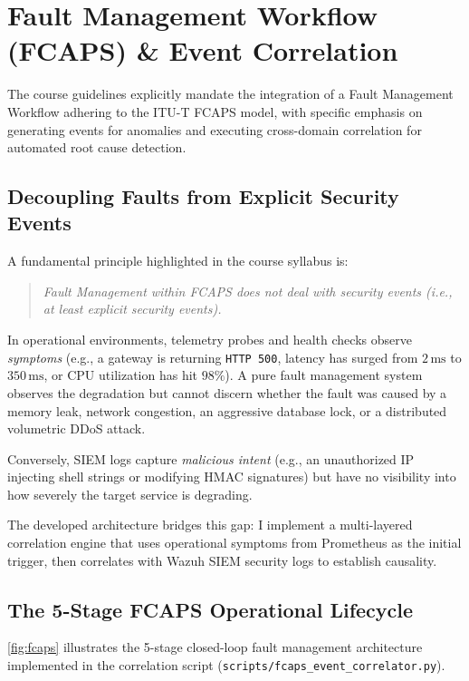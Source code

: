 \section{Fault Management Workflow (FCAPS) \& Event Correlation}
\label{sec:fcaps}

The course guidelines explicitly mandate the integration of a Fault Management Workflow adhering to the ITU-T FCAPS model, with specific emphasis on generating events for anomalies and executing cross-domain correlation for automated root cause detection.

\subsection{Decoupling Faults from Explicit Security Events}
A fundamental principle highlighted in the course syllabus is:
\begin{quote}
\textit{Fault Management within FCAPS does not deal with security events (i.e., at least explicit security events).}
\end{quote}
In operational environments, telemetry probes and health checks observe \textit{symptoms} (e.g., a gateway is returning \texttt{HTTP 500}, latency has surged from $2\,\text{ms}$ to $350\,\text{ms}$, or CPU utilization has hit $98\%$). A pure fault management system observes the degradation but cannot discern whether the fault was caused by a memory leak, network congestion, an aggressive database lock, or a distributed volumetric DDoS attack. 

Conversely, SIEM logs capture \textit{malicious intent} (e.g., an unauthorized IP injecting shell strings or modifying HMAC signatures) but have no visibility into how severely the target service is degrading. 

The developed architecture bridges this gap: I implement a multi-layered correlation engine that uses operational symptoms from Prometheus as the initial trigger, then correlates with Wazuh SIEM security logs to establish causality.

\subsection{The 5-Stage FCAPS Operational Lifecycle}
\cref{fig:fcaps} illustrates the 5-stage closed-loop fault management architecture implemented in the correlation script (\texttt{scripts/}\allowbreak\texttt{fcaps\_event\_correlator.py}).

